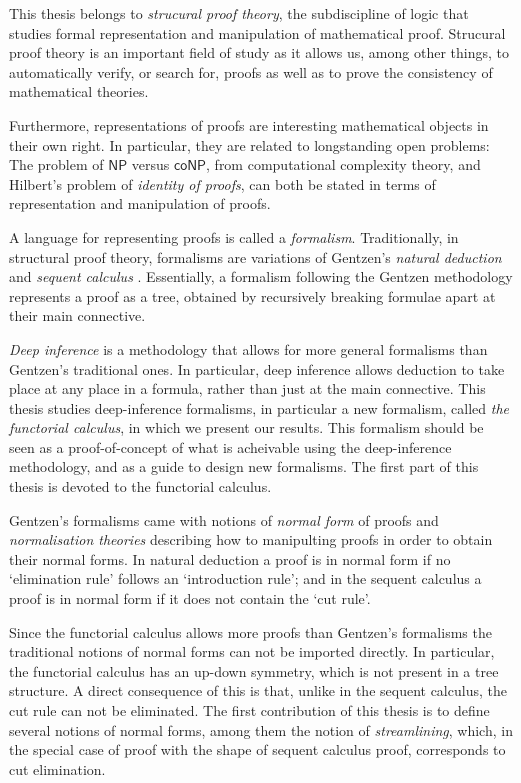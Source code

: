 This thesis belongs to \emph{strucural proof theory}, the subdiscipline of logic that studies formal representation and manipulation of mathematical proof. Strucural proof theory is an important field of study as it allows us, among other things, to automatically verify, or search for, proofs as well as to prove the consistency of mathematical theories.

Furthermore, representations of proofs are interesting mathematical objects in
their own right. In particular, they are related to longstanding open problems:
The problem of $\mathsf{NP}$ versus $\mathsf{coNP}$, from computational
complexity theory, and Hilbert's problem of \emph{identity of proofs}, can both
be stated in terms of representation and manipulation of proofs.

A language for representing proofs is called a \emph{formalism}. Traditionally,
in structural proof theory, formalisms are variations of Gentzen's \emph{natural
deduction} and \emph{sequent calculus} \cite{Gent:69:Investig:xi}. Essentially,
a formalism following the Gentzen methodology represents a proof as a tree,
obtained by recursively breaking formulae apart at their main connective.

\emph{Deep inference} \cite{Gugl:06:A-System:kl} is a methodology that allows
for more general formalisms than Gentzen's traditional ones. In particular, deep
inference allows deduction to take place at any place in a formula, rather than
just at the main connective. This thesis studies deep-inference formalisms, in particular a new 
formalism, called \emph{the functorial calculus}, in which we present our
results. This formalism should be seen as a proof-of-concept of what is
acheivable using the deep-inference methodology, and as a guide to design new
formalisms. The first part of this thesis is devoted to the functorial calculus.

Gentzen's formalisms came with notions of \emph{normal form} of proofs and \emph{normalisation theories} describing how to manipulting proofs in order to obtain their normal forms. In natural deduction a proof is in normal form if no `elimination rule' follows an `introduction rule'; and in the sequent calculus a proof is in normal form if it does not contain the `cut rule'.

Since the functorial calculus allows more proofs than Gentzen's formalisms the traditional notions of normal forms can not be imported directly. In particular, the functorial calculus has an up-down symmetry, which is not present in a tree structure. A direct consequence of this is that, unlike in the sequent calculus, the cut rule can not be eliminated. The first contribution of this thesis is to define several notions of normal forms, among them the notion of \emph{streamlining}, which, in the special case of proof with the shape of sequent calculus proof, corresponds to cut elimination.

